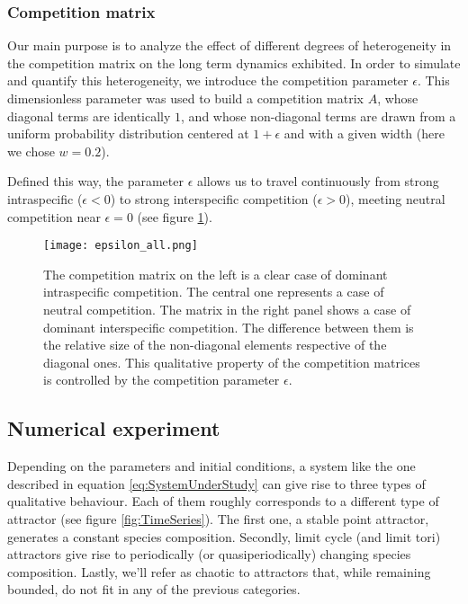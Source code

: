 \subsubsection{Competition matrix}
\label{subsubsec:CompetitionParameter}

Our main purpose is to analyze the effect of different degrees of heterogeneity in the competition matrix on the long term dynamics exhibited. In order to simulate and quantify this heterogeneity, we introduce the competition parameter $ \epsilon $. This dimensionless parameter was used to build a competition matrix $A$, whose diagonal terms are identically $ 1 $, and whose non-diagonal terms are drawn from a uniform probability distribution centered at $ 1 + \epsilon $ and with a given width (here we chose $ w = 0.2$).

Defined this way, the parameter $\epsilon$ allows us to travel continuously from strong intraspecific ($ \epsilon < 0$) to strong interspecific competition ($ \epsilon > 0$), meeting neutral competition near $\epsilon = 0$ (see figure \ref{fig:CompetitionParameter}).

\begin{figure}[H]
	\begin{center}
		\texttt{[image: epsilon\_all.png]}
	\end{center}
	\caption{The competition matrix on the left is a clear case of dominant intraspecific competition. The central one represents a case of neutral competition. The matrix in the right panel shows a case of dominant interspecific competition. The difference between them is the relative size of the non-diagonal elements respective of the diagonal ones. This qualitative property of the competition matrices is controlled by the competition parameter $\epsilon$.}	
	\label{fig:CompetitionParameter}
\end{figure}

\subsection{Numerical experiment}
\label{subsec:NumericalExperiment}

Depending on the parameters and initial conditions, a system like the one described in equation \ref{eq:SystemUnderStudy} can give rise to three types of qualitative behaviour. Each of them roughly corresponds to a different type of attractor (see figure \ref{fig:TimeSeries}). The first one, a stable point attractor, generates a constant species composition. Secondly, limit cycle (and limit tori) attractors give rise to periodically (or quasiperiodically) changing species composition. Lastly, we'll refer as chaotic to attractors that, while remaining bounded, do not fit in any of the previous categories.

